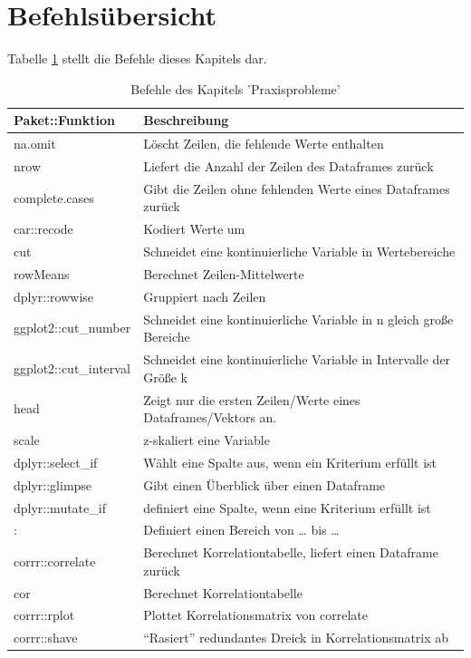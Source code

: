 \documentclass[12pt,ngerman,]{book}
\theoremstyle{definition}
\theoremstyle{definition}
\theoremstyle{remark}
\begin{document}
\section{Befehlsübersicht}\label{befehlsubersicht-3}

Tabelle \ref{tab:befehle-praxisprobleme} stellt die Befehle dieses
Kapitels dar.

\begin{table}

\caption{\label{tab:befehle-praxisprobleme}Befehle des Kapitels 'Praxisprobleme'}
\centering
\begin{tabular}[t]{l|l}
\hline
Paket::Funktion & Beschreibung\\
\hline
na.omit & Löscht Zeilen, die fehlende Werte enthalten\\
\hline
nrow & Liefert die Anzahl der Zeilen des Dataframes zurück\\
\hline
complete.cases & Gibt die Zeilen ohne fehlenden Werte eines Dataframes zurück\\
\hline
car::recode & Kodiert Werte um\\
\hline
cut & Schneidet eine kontinuierliche Variable in Wertebereiche\\
\hline
rowMeans & Berechnet Zeilen-Mittelwerte\\
\hline
dplyr::rowwise & Gruppiert nach Zeilen\\
\hline
ggplot2::cut\_number & Schneidet eine kontinuierliche Variable in n gleich große Bereiche\\
\hline
ggplot2::cut\_interval & Schneidet eine kontinuierliche Variable in Intervalle der Größe k\\
\hline
head & Zeigt nur die ersten Zeilen/Werte eines Dataframes/Vektors an.\\
\hline
scale & z-skaliert eine Variable\\
\hline
dplyr::select\_if & Wählt eine Spalte aus, wenn ein Kriterium erfüllt ist\\
\hline
dplyr::glimpse & Gibt einen Überblick über einen Dataframe\\
\hline
dplyr::mutate\_if & definiert eine Spalte, wenn eine Kriterium erfüllt ist\\
\hline
: & Definiert einen Bereich von … bis …\\
\hline
corrr::correlate & Berechnet Korrelationtabelle, liefert einen Dataframe zurück\\
\hline
cor & Berechnet Korrelationtabelle\\
\hline
corrr::rplot & Plottet Korrelationsmatrix von correlate\\
\hline
corrr::shave & “Rasiert” redundantes Dreick in Korrelationsmatrix ab\\
\hline
\end{tabular}
\end{table}
\end{document}
